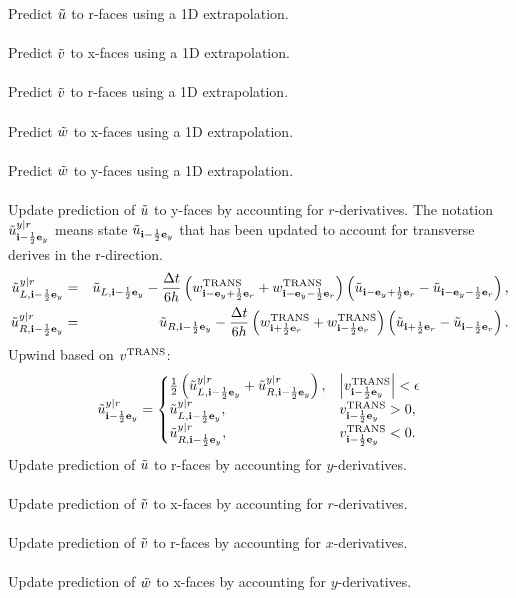 Predict $\tilde{u}$ to r-faces using a 1D extrapolation.\\ \\
Predict $\tilde{v}$ to x-faces using a 1D extrapolation.\\ \\
Predict $\tilde{v}$ to r-faces using a 1D extrapolation.\\ \\
Predict $\tilde{w}$ to x-faces using a 1D extrapolation.\\ \\
Predict $\tilde{w}$ to y-faces using a 1D extrapolation.\\ \\
Update prediction of $\tilde{u}$ to y-faces by accounting for $r$-derivatives.
The notation $\tilde{u}_{{\bf i}-\frac{1}{2}{\bf e}_y}^{y|r}$ means state $\tilde{u}_{{\bf i}-\frac{1}{2}{\bf e}_y}$ that has been updated to account for transverse derives in the r-direction.
\begin{eqnarray}
\tilde{u}_{L,{\bf i}-\frac{1}{2}{\bf e}_y}^{y|r} &=& \tilde{u}_{L,{\bf i}-\frac{1}{2}{\bf e}_y} - \frac{\Delta t}{6h}\left(w_{{\bf i}-{\bf e}_y+\frac{1}{2}{\bf e}_r}^{\rm TRANS}+w_{{\bf i}-{\bf e}_y-\frac{1}{2}{\bf e}_r}^{\rm TRANS}\right)\left(\tilde{u}_{{\bf i}-{\bf e}_y+\frac{1}{2}{\bf e}_r}-\tilde{u}_{{\bf i}-{\bf e}_y-\frac{1}{2}{\bf e}_r}\right), \\
\tilde{u}_{R,{\bf i}-\frac{1}{2}{\bf e}_y}^{y|r} &=& \tilde{u}_{R,{\bf i}-\frac{1}{2}{\bf e}_y} - \frac{\Delta t}{6h}\left(w_{{\bf i}+\frac{1}{2}{\bf e}_r}^{\rm TRANS}+w_{{\bf i}-\frac{1}{2}{\bf e}_r}^{\rm TRANS}\right)\left(\tilde{u}_{{\bf i}+\frac{1}{2}{\bf e}_r}-\tilde{u}_{{\bf i}-\frac{1}{2}{\bf e}_r}\right).
\end{eqnarray}
Upwind based on $v^{\rm TRANS}$:
\begin{equation}
\tilde{u}_{{\bf i}-\frac{1}{2}{\bf e}_y}^{y|r} =
\begin{cases}
\frac{1}{2}\left(\tilde{u}_{L,{\bf i}-\frac{1}{2}{\bf e}_y}^{y|r} + \tilde{u}_{R,{\bf i}-\frac{1}{2}{\bf e}_y}^{y|r}\right), & \left|v_{{\bf i}-\frac{1}{2}{\bf e}_y}^{\rm TRANS}\right| < \epsilon \\
\tilde{u}_{L,{\bf i}-\frac{1}{2}{\bf e}_y}^{y|r}, & v_{{\bf i}-\frac{1}{2}{\bf e}_y}^{\rm TRANS} > 0, \\
\tilde{u}_{R,{\bf i}-\frac{1}{2}{\bf e}_y}^{y|r}, & v_{{\bf i}-\frac{1}{2}{\bf e}_y}^{\rm TRANS} < 0.
\end{cases}
\end{equation}
Update prediction of $\tilde{u}$ to r-faces by accounting for $y$-derivatives. \\ \\
Update prediction of $\tilde{v}$ to x-faces by accounting for $r$-derivatives. \\ \\
Update prediction of $\tilde{v}$ to r-faces by accounting for $x$-derivatives. \\ \\
Update prediction of $\tilde{w}$ to x-faces by accounting for $y$-derivatives. \\ \\
